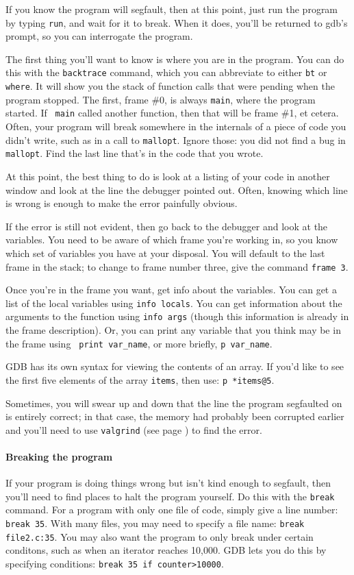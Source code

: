 \documentclass[12pt]{article}
\begin{document}
If you know the program will segfault, then at this point, just run the program
by typing {\tt run}, and wait for it to break. When it does, you'll be
returned to gdb's prompt, so you can interrogate the program.

The first thing you'll want to know is where you are in the program. You
can do this with the {\tt backtrace} command, which you can abbreviate to
either {\tt bt} or {\tt where}. It will show you the stack of function
calls that were pending when the program stopped.  The first, frame
\#0, is always {\tt main}, where the program started. If {\tt
main} called another function, then that will be frame \#1, et cetera.
Often, your program will break somewhere in the internals of a piece of
code you didn't write, such as in a call to {\tt mallopt}. Ignore those:
you did not find a bug in {\tt mallopt}. Find the last line that's in
the code that you wrote.

At this point, the best thing to do is look at a listing of your code
in another window and look at the line the debugger pointed out. Often,
knowing which line is wrong is enough to make the error painfully obvious.

If the error is still not evident, then go back to the debugger and look
at the variables. You need to be aware of which frame you're working in,
so you know which set of variables you have at your disposal.  You
will default to the last frame in the stack; to change to frame number
three, give the command {\tt frame 3}.

Once you're in the frame you want, get info about the variables. You can
get a list of the local variables using {\tt info locals}. You can get
information about the arguments to the function using {\tt info args}
(though this information is already in the frame description). Or, you
can print any variable that you think may be in the frame using {\tt
print var\_name}, or more briefly, {\tt p var\_name}. 

GDB has its own syntax for viewing the contents of an array. If you'd
like to see the first five elements of the array {\tt items}, then use:
{\tt p *items@5}.

Sometimes, you will swear up and down that the line the program segfaulted on is
entirely correct; in that case, the memory had probably been corrupted earlier and
you'll need to use {\tt valgrind} (see page \pageref{valgrind}) to find the error.

\paragraph{Breaking the program} If your program is doing things wrong but isn't kind
enough to segfault, then you'll need to find places to halt the program
yourself. Do this with the {\tt break} command. For a program with only
one file of code, simply give a line number: {\tt break 35}. With many
files, you may need to specify a file name: {\tt break file2.c:35}. You
may also want the program to only break under certain conditons, such
as when an iterator reaches 10,000. GDB lets you do this by specifying
conditions: {\tt break 35 if counter>10000}.
\end{document}
